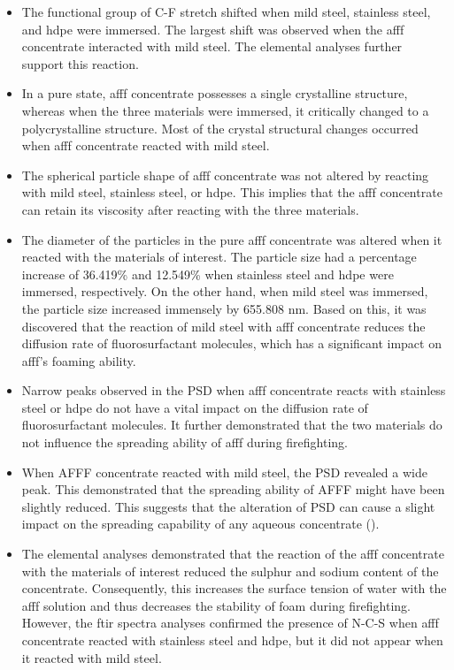 \begin{itemize}
    \item The functional group of C-F stretch shifted when mild steel, stainless steel, and \acrshort{hdpe} were immersed. The largest shift was observed when the \acrshort{afff} concentrate interacted with mild steel. The elemental analyses further support this reaction.
    \item In a pure state, \acrshort{afff} concentrate possesses a single crystalline structure, whereas when the three materials were immersed, it critically changed to a polycrystalline structure. Most of the crystal structural changes occurred when \acrshort{afff} concentrate reacted with mild steel.
    \item The spherical particle shape of \acrshort{afff} concentrate was not altered by reacting with mild steel, stainless steel, or \acrshort{hdpe}. This implies that the \acrshort{afff} concentrate can retain its viscosity after reacting with the three materials.
    \item The diameter of the particles in the pure \acrshort{afff} concentrate was altered when it reacted with the materials of interest. The particle size had a percentage increase of 36.419\% and 12.549\% when stainless steel and \acrshort{hdpe} were immersed, respectively. On the other hand, when mild steel was immersed, the particle size increased immensely by 655.808 nm. Based on this, it was discovered that the reaction of mild steel with \acrshort{afff} concentrate reduces the diffusion rate of fluorosurfactant molecules, which has a significant impact on \acrshort{afff}'s foaming ability. 
    \item Narrow peaks observed in the PSD when \acrshort{afff} concentrate reacts with stainless steel or \acrshort{hdpe} do not have a vital impact on the diffusion rate of fluorosurfactant molecules. It further demonstrated that the two materials do not influence the spreading ability of \acrshort{afff} during firefighting.
    \item When AFFF concentrate reacted with mild steel, the PSD revealed a wide peak. This demonstrated that the spreading ability of AFFF might have been slightly reduced. This suggests that the alteration of PSD can cause a slight impact on the spreading capability of any aqueous concentrate (\cite{machhi2021effect}).
    \item The elemental analyses demonstrated that the reaction of the \acrshort{afff} concentrate with the materials of interest reduced the sulphur and sodium content of the concentrate. Consequently, this increases the surface tension of water with the \acrshort{afff} solution and thus decreases the stability of foam during firefighting. However, the \acrshort{ftir} spectra analyses confirmed the presence of N-C-S when \acrshort{afff} concentrate reacted with stainless steel and \acrshort{hdpe}, but it did not appear when it reacted with mild steel.

\end{itemize}
